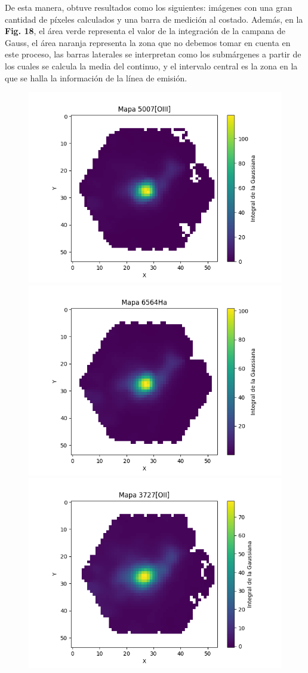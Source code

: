 \documentclass[10pt,twocolumn,a4paper]{opticajnl}
\begin{document}
De esta manera, obtuve resultados como los siguientes: imágenes con una gran cantidad de píxeles calculados y una barra de medición al costado. Además, en la \textbf{Fig. 18}, el área verde representa el valor de la integración de la campana de Gauss, el área naranja representa la zona que no debemos tomar en cuenta en este proceso, las barras laterales se interpretan como los submárgenes a partir de los cuales se calcula la media del continuo, y el intervalo central es la zona en la que se halla la información de la línea de emisión.

\begin{figure}
    \centering
    \includegraphics[width=0.8\linewidth]{../Codigos/extractorLineasEmision/imgs/imgs7495-6102_lines/img7495-6102_[OIII]_5007_.png}
    \includegraphics[width=0.8\linewidth]{../Codigos/extractorLineasEmision/imgs/imgs7495-6102_lines/img7495-6102_Ha_6564_.png}
    \includegraphics[width=0.8\linewidth]{../Codigos/extractorLineasEmision/imgs/imgs7495-6102_lines/img7495-6102_[OII]_3727_.png}

\end{figure}
\end{document}
